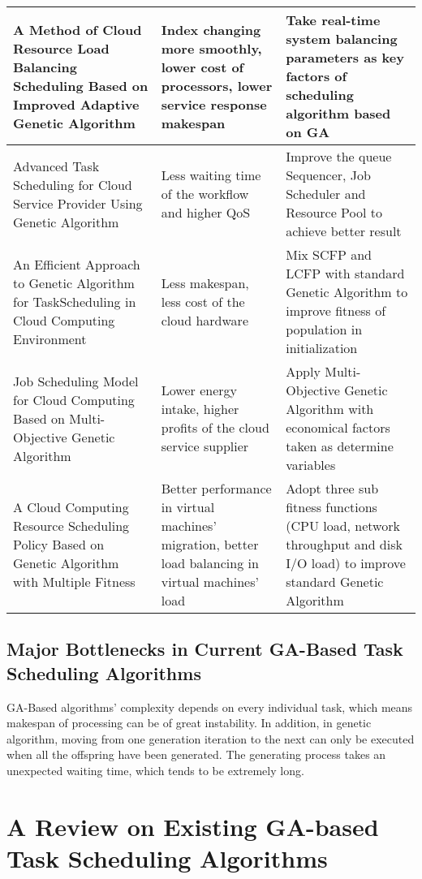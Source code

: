 \documentclass[10pt,twoside,openright,logo]{report}
\begin{document}
\begin{table}[h]
\begin{tabularx}{0.9\textwidth}{| X | X | X |}
	A Method of Cloud Resource Load Balancing Scheduling Based on Improved Adaptive Genetic Algorithm \cite{11} & Index changing more smoothly, lower cost of processors, lower service response makespan & Take real-time system balancing parameters as key factors of scheduling algorithm based on GA \\ \hline
	Advanced Task Scheduling for Cloud Service Provider Using Genetic Algorithm \cite{12} & Less waiting time of the workflow and higher QoS & Improve the queue Sequencer, Job Scheduler and Resource Pool to achieve better result  \\ \hline
	An Efficient Approach to Genetic Algorithm for TaskScheduling in Cloud Computing Environment \cite{3} & Less makespan, less cost of the cloud hardware & Mix SCFP and LCFP with standard Genetic Algorithm to improve fitness of population in initialization \\ \hline
	Job Scheduling Model for Cloud Computing Based on Multi-Objective Genetic Algorithm \cite{13} & Lower energy intake, higher profits of the cloud service supplier & Apply Multi-Objective Genetic Algorithm with economical factors taken as determine variables \\ \hline
	A Cloud Computing Resource Scheduling Policy Based on Genetic Algorithm with Multiple Fitness \cite{14} & Better performance in virtual machines’ migration, better load balancing in virtual machines’ load & Adopt three sub fitness functions (CPU load, network throughput and disk I/O load) to improve standard Genetic Algorithm \\ \hline
	
\end{tabularx}
\end{table}

\section{Major Bottlenecks in Current GA-Based Task Scheduling Algorithms}
GA-Based algorithms’ complexity depends on every individual task, which means makespan of processing can be of great instability.
In addition, in genetic algorithm, moving from one generation iteration to the next can only be executed when all the offspring have been generated. The generating process takes an unexpected waiting time, which tends to be extremely long.

\chapter{A Review on Existing GA-based Task Scheduling Algorithms}
\end{document}
